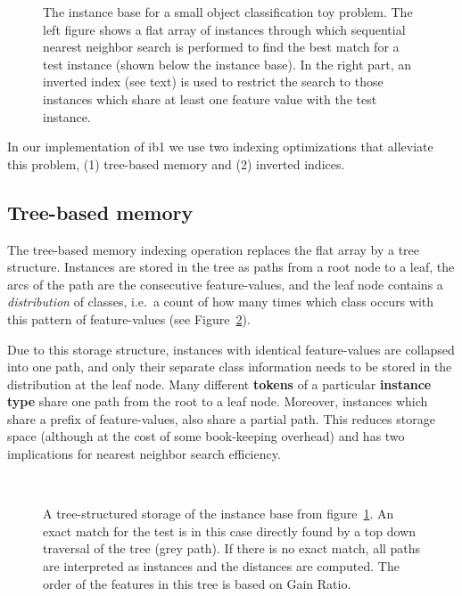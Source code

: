 \documentclass{report}
\begin{document}
\begin{figure}[htb]
        \begin{center}
                \leavevmode
                \columnwidth
                \caption{The instance base for a small object
                classification toy problem. The left figure shows a
                flat array of instances through which sequential
                nearest neighbor search is performed to find the best 
		match for a test instance (shown below the instance
                base). 
		In the right part, an inverted index (see text)
                is used to restrict the search to those instances
                which share at least one feature value with the test
                instance.
                }
                \label{example1}
        \end{center}
\end{figure}

In our implementation of {\sc ib1} we use two indexing optimizations
that alleviate this problem, (1) tree-based memory and (2) inverted
indices.

\subsection{Tree-based memory}

The tree-based memory indexing operation replaces the flat array
by a tree structure. Instances are stored in the tree as
paths from a root node to a leaf, the arcs of the path are the
consecutive feature-values, and the leaf node contains a {\em
distribution} of classes, i.e.~a count of how many times which class
occurs with this pattern of feature-values (see Figure~\ref{example2}).

Due to this storage structure, instances with identical feature-values
are collapsed into one path, and only their separate class
information needs to be stored in the distribution at the leaf
node. Many different {\bf tokens} of a particular {\bf instance type}
share one path from the root to a leaf node. Moreover, instances which
share a prefix of feature-values, also share a partial path. This
reduces storage space (although at the cost of some book-keeping
overhead) and has two implications for nearest neighbor search
efficiency.

\begin{figure}[htb]
        \begin{center}
                \leavevmode
                \columnwidth
                \
                \caption{A tree-structured storage of the instance
                base from figure~\ref{example1}. An exact match for
                the test is in this case directly found by a top down
                traversal of the tree (grey path). If there is no
                exact match, all paths are interpreted as instances
                and the distances are computed. The order of the
                features in this tree is based on Gain Ratio.
                }
                \label{example2}
        \end{center}
\end{figure}
\end{document}

